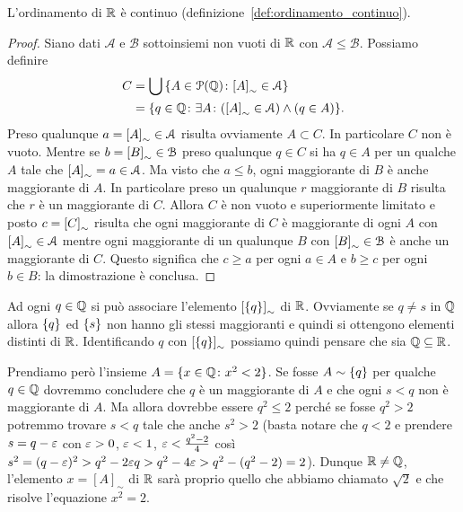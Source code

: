 \begin{theorem}  
L'ordinamento di ${\mathbb R}$ è continuo
(definizione~\ref{def:ordinamento_continuo}).
\end{theorem}
\begin{proof}
Siano dati $\mathcal A$ e $\mathcal B$ sottoinsiemi non vuoti di ${\mathbb R}$ 
con $\mathcal A\le \mathcal B$. 
Possiamo definire
\begin{align*}
  C & = \bigcup{\left\{ A\in \mathcal P({\mathbb Q})\colon {\left[ A \right]}_\sim \in \mathcal A \right\}} \\
    &= {\left\{ q\in {\mathbb Q}\colon \exists A\colon 
    ({\left[ A \right]}_\sim \in \mathcal A) \land (q\in A) \right\}}.
\end{align*}
Preso qualunque $a={\left[ A \right]}_\sim \in \mathcal A$ risulta 
ovviamente $A\subset C$. In particolare $C$ non è vuoto.
Mentre se $b={\left[ B \right]}_\sim \in \mathcal B$ 
preso qualunque $q\in C$ si ha $q\in A$ per un qualche $A$ tale che 
${\left[ A \right]}_\sim = a\in \mathcal A$.
Ma visto che $a\le b$, ogni maggiorante di $B$ è anche maggiorante di $A$.
In particolare preso un qualunque $r$ maggiorante di $B$
risulta che $r$ è un maggiorante di $C$.
Allora $C$ è non vuoto e superiormente limitato 
e posto $c={\left[ C \right]}_\sim$ 
risulta che ogni maggiorante di $C$ è maggiorante di 
ogni $A$ con ${\left[ A \right]}_\sim \in \mathcal A$ mentre 
ogni maggiorante di un qualunque $B$ con ${\left[ B \right]}_\sim\in \mathcal B$ 
è anche un maggiorante di $C$.
Questo significa che $c\ge a$ per ogni $a\in A$ 
e $b\ge c$ per ogni $b\in B$: la dimostrazione è conclusa.
\end{proof}

Ad ogni $q\in {\mathbb Q}$ si può associare l'elemento ${\left[ {\left\{ q \right\}} \right]}_\sim$ 
di ${\mathbb R}$. Ovviamente se $q\neq s$ in ${\mathbb Q}$ allora ${\left\{ q \right\}}$ 
ed ${\left\{ s \right\}}$ non hanno gli stessi maggioranti e quindi si ottengono 
elementi distinti di ${\mathbb R}$. Identificando $q$ con ${\left[ {\left\{ q \right\}} \right]}_\sim$ 
possiamo quindi pensare che sia ${\mathbb Q} \subseteq {\mathbb R}$.

Prendiamo però l'insieme $A=\{x\in {\mathbb Q}\colon x^2<2\}$.
Se fosse $A\sim {\left\{ q \right\}}$ per qualche $q\in {\mathbb Q}$ dovremmo 
concludere che $q$ è un maggiorante di $A$ e che ogni $s<q$ 
non è maggiorante di $A$. 
Ma allora dovrebbe essere $q^2\le 2$ perché se fosse $q^2>2$
potremmo trovare $s<q$ tale che anche $s^2>2$ 
(basta notare che $q<2$ e prendere $s=q-\varepsilon$ con $\varepsilon>0$, $\varepsilon<1$, 
$\varepsilon<\frac{q^2-2}{4}$ così $s^2=(q-\varepsilon)^2 > q^2-2\varepsilon q > q^2-4\varepsilon
> q^2-(q^2-2) = 2$).
Dunque ${\mathbb R}\neq {\mathbb Q}$, l'elemento $x=[A]_\sim$ di ${\mathbb R}$ sarà 
proprio quello che abbiamo chiamato $\sqrt 2$ e che risolve 
l'equazione $x^2=2$. 

